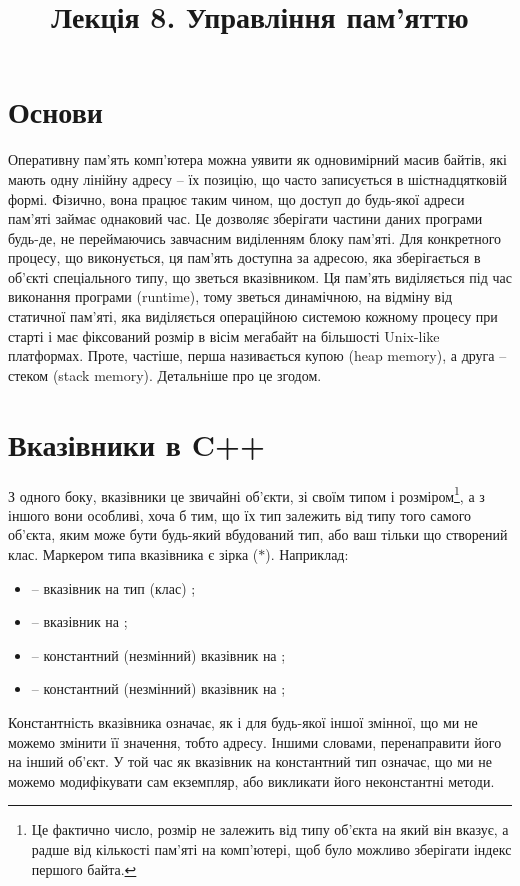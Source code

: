 \documentclass[12pt]{article}
\title{Лекція 8. Управління пам'яттю}
\begin{document}
	\maketitle

	\tableofcontents
	
    \section{Основи}
    Оперативну пам'ять комп'ютера можна уявити як одновимірний масив байтів, які мають одну лінійну адресу -- їх позицію, що часто записується в шістнадцятковій формі. Фізично, вона працює таким чином, що доступ до будь-якої адреси пам'яті займає однаковий час. Це дозволяє зберігати частини даних програми будь-де, не переймаючись завчасним виділенням блоку пам'яті. Для конкретного процесу, що виконується, ця пам'ять доступна за адресою, яка зберігається в об'єкті спеціального типу, що зветься вказівником. Ця пам'ять виділяється під час виконання програми (runtime), тому зветься динамічною, на відміну від статичної пам'яті, яка виділяється операційною системою кожному процесу при старті і має фіксований розмір в вісім мегабайт на більшості Unix-like платформах. Проте, частіше, перша називається купою (heap memory), а друга -- стеком (stack memory). Детальніше про це згодом.

    \section{Вказівники в C++}
    З одного боку, вказівники це звичайні об'єкти, зі своїм типом і розміром\footnote{Це фактично число, розмір не залежить від типу об'єкта на який він вказує, а радше від кількості пам'яті на комп'ютері, щоб було можливо зберігати індекс першого байта.}, а з іншого вони особливі, хоча б тим, що їх тип залежить від типу того самого об'єкта, яким може бути будь-який вбудований тип, або ваш тільки що створений клас. Маркером типа вказівника є зірка ($*$). Наприклад:
    \begin{itemize}
        \item {} -- вказівник на тип (клас) ;
        \item {} -- вказівник на ;
        \item {} -- константний (незмінний) вказівник на ;
        \item {} -- константний (незмінний) вказівник на ;
    \end{itemize}
    Константність вказівника означає, як і для будь-якої іншої змінної, що ми не можемо змінити її значення, тобто адресу. Іншими словами, перенаправити його на інший об'єкт. У той час як вказівник на константний тип означає, що ми не можемо модифікувати сам екземпляр, або викликати його неконстантні методи.
\end{document}
